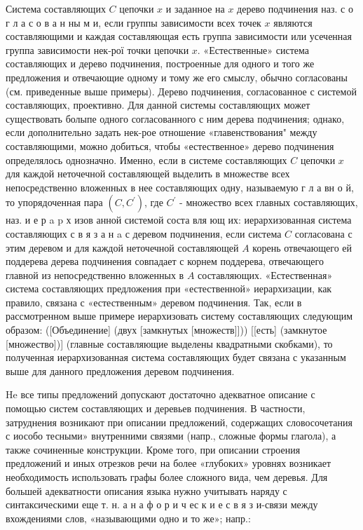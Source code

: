 \documentclass[10pt]{article}
\begin{document}
Система составляющих $C$ цепочки $x$ и заданное на $x$ дерево подчинения наз. с о г л а с о в а н ны м и, если группы зависимости всех точек $x$ являются составляющими и каждая составляющая есть группа зависимости или усеченная группа зависимости нек-рої точки цепочки $x$. «Естественные» система составляющих и дерево подчинения, построенные для одного и того же предложения и отвечающие одному и тому же его смыслу, обычно согласованы (см. приведенные выше примеры). Дерево подчинения, согласованное с системой составляющих, проективно. Для данной системы составляющих может существовать болыпе одного согласованного с ним дерева подчинения; однако, если дополнительно задать нек-рое отношение «главенствования" между составляющими, можно добиться, чтобы «естественное» дерево подчинения определялось однозначно. Именно, если в системе составляющих $C$ цепочки $x$ для каждой неточечной составляющей выделить в множестве всех непосредственно вложенных в нее составляющих одну, называемую г л а вн о й, то упорядоченная пара $\left(C, C^{\prime}\right)$, где $C^{\prime}$ - множество всех главных составляющих, наз. и е р a p х изов анной системой соста вля ющ их: иерархизованная система составляющих с в я з а н a с деревом подчинения, если система $C$ согласована с этим деревом и для каждой неточечной составляющей $A$ корень отвечающего ей поддерева дерева подчинения совпадает с корнем поддерева, отвечающего главной из непосредственно вложенных в $A$ составляющих. «Естественная» система составляющих предложения при «естественной» иерархизации, как правило, связана с «естественным» деревом подчинения. Так, если в рассмотренном выше примере иерархизовать систему составляющих следующим образом: ([Объединение] (двух [замкнутых [множеств]])) [[есть] (замкнутое [множество])] (главные составляющие выделены квадратными скобками), то полученная иерархизованная система составляющих будет связана с указанным выше для данного предложения деревом подчинения.



$\mathrm{He}$ все типы предложений допускают достаточно адекватное описание с помощью систем составляющих и деревьев подчинения. В частности, затруднения возникают при описании предложений, содержащих словосочетания с иособо тесными» внутренними связями (напр., сложные формы глагола), а также сочиненные конструкции. Кроме того, при описании строения предложений и иных отрезков речи на более «глубоких» уровнях возникает необходимость использовать графы более сложного вида, чем деревья. Для большей адекватности описания языка нужно учитывать наряду с синтаксическими еще т. н. а н а ф о р и ч ес к и е с в я з и-связи между вхождениями слов, «называющими одно и то же»; напр.:
\end{document}
